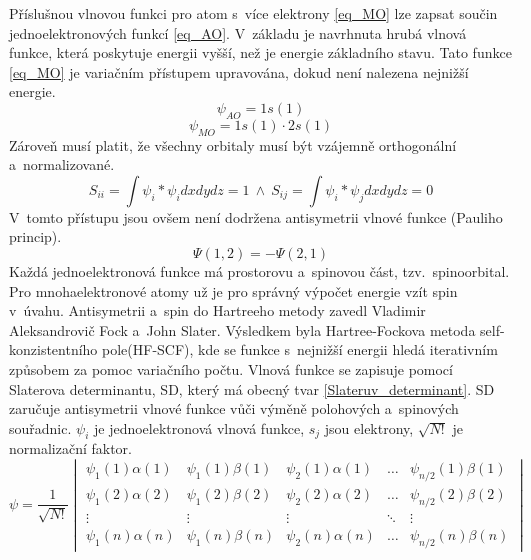 \documentclass[
  printed, %
  table,   %
  lof,     %
  lot,     %
  oneside,
]{fithesis3}
\begin{document}
Příslušnou vlnovou funkci pro atom s~více elektrony \ref{eq_MO} lze zapsat součin jednoelektronových funkcí \ref{eq_AO}.  V~základu je navrhnuta hrubá vlnová funkce, která poskytuje energii vyšší, než je energie základního stavu. Tato funkce \ref{eq_MO} je variačním přístupem upravována, dokud není nalezena nejnižší energie.  
\begin{equation}
\psi_{AO} = 1s(1)
\label{eq_AO}
\end{equation}
\begin{equation}
\psi_{MO} = 1s(1) \cdot 2s(1)
\label{eq_MO}
\end{equation} 
Zároveň musí platit, že všechny orbitaly musí být vzájemně orthogonální a~normalizované.
\begin{equation}
S_{ii} = \int \psi_i * \psi_i dx dy dz = 1 ~ \wedge ~ S_{ij} = \int \psi_i * \psi_j dx dy dz = 0
\end{equation}
V~tomto přístupu jsou ovšem není dodržena antisymetrii vlnové funkce (Pauliho princip). \cite{warren1986ab}
\begin{equation}
\Psi (1,2) = - \Psi (2,1)
\label{Paulliho_princip}
\end{equation}
 Každá jednoelektronová funkce má prostorovu a~spinovou část, tzv.~spinoorbital. Pro mnohaelektronové atomy už je pro správný výpočet energie vzít spin v~úvahu.  Antisymetrii a~spin do Hartreeho metody zavedl Vladimir Aleksandrovič Fock a~John Slater. Výsledkem byla Hartree-Fockova metoda self-konzistentního pole(HF-SCF), kde se funkce s~nejnižší energii hledá iterativním způsobem za pomoc variačního počtu. Vlnová funkce se zapisuje pomocí Slaterova determinantu, SD, který má obecný tvar \ref{Slateruv_determinant}. SD zaručuje antisymetrii vlnové funkce vůči výměně polohových a~spinových souřadnic. $\psi_i$ je jednoelektronová vlnová funkce, $s_j$ jsou elektrony, $\sqrt{N!}$ je normalizační faktor.
\begin{equation}
\psi =  \frac{1}{\sqrt{N!}}\begin{vmatrix}
\psi_1(1)\alpha(1) & \psi_1(1) \beta (1) & \psi_2(1)\alpha(1) & \dots & \psi_{n/2}(1)\beta(1) \\
\psi_1(2)\alpha(2) & \psi_1(2) \beta (2) & \psi_2(2)\alpha(2) & \dots & \psi_{n/2}(2)\beta(2) \\
\vdots             & \vdots              & \vdots             & \ddots & \vdots \\
\psi_1(n)\alpha(n) & \psi_1(n) \beta (n) & \psi_2(n)\alpha(n) & \dots & \psi_{n/2}(n)\beta(n) 
\end{vmatrix}
\label{Slateruv_determinant}
\end{equation}
\end{document}

